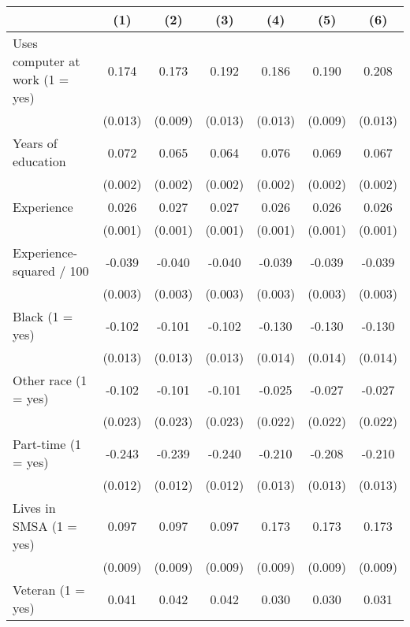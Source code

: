\begin{tabular}{l*{6}{c}}
\hline\hline
            &\multicolumn{1}{c}{(1)}&\multicolumn{1}{c}{(2)}&\multicolumn{1}{c}{(3)}&\multicolumn{1}{c}{(4)}&\multicolumn{1}{c}{(5)}&\multicolumn{1}{c}{(6)}\\
\hline
Uses computer at work (1 = yes)&       0.174&       0.173&       0.192&       0.186&       0.190&       0.208\\
            &     (0.013)&     (0.009)&     (0.013)&     (0.013)&     (0.009)&     (0.013)\\
Years of education&       0.072&       0.065&       0.064&       0.076&       0.069&       0.067\\
            &     (0.002)&     (0.002)&     (0.002)&     (0.002)&     (0.002)&     (0.002)\\
Experience  &       0.026&       0.027&       0.027&       0.026&       0.026&       0.026\\
            &     (0.001)&     (0.001)&     (0.001)&     (0.001)&     (0.001)&     (0.001)\\
Experience-squared / 100&      -0.039&      -0.040&      -0.040&      -0.039&      -0.039&      -0.039\\
            &     (0.003)&     (0.003)&     (0.003)&     (0.003)&     (0.003)&     (0.003)\\
Black (1 = yes)&      -0.102&      -0.101&      -0.102&      -0.130&      -0.130&      -0.130\\
            &     (0.013)&     (0.013)&     (0.013)&     (0.014)&     (0.014)&     (0.014)\\
Other race (1 = yes)&      -0.102&      -0.101&      -0.101&      -0.025&      -0.027&      -0.027\\
            &     (0.023)&     (0.023)&     (0.023)&     (0.022)&     (0.022)&     (0.022)\\
Part-time (1 = yes)&      -0.243&      -0.239&      -0.240&      -0.210&      -0.208&      -0.210\\
            &     (0.012)&     (0.012)&     (0.012)&     (0.013)&     (0.013)&     (0.013)\\
Lives in SMSA (1 = yes)&       0.097&       0.097&       0.097&       0.173&       0.173&       0.173\\
            &     (0.009)&     (0.009)&     (0.009)&     (0.009)&     (0.009)&     (0.009)\\
Veteran (1 = yes)&       0.041&       0.042&       0.042&       0.030&       0.030&       0.031\\

\end{tabular}
